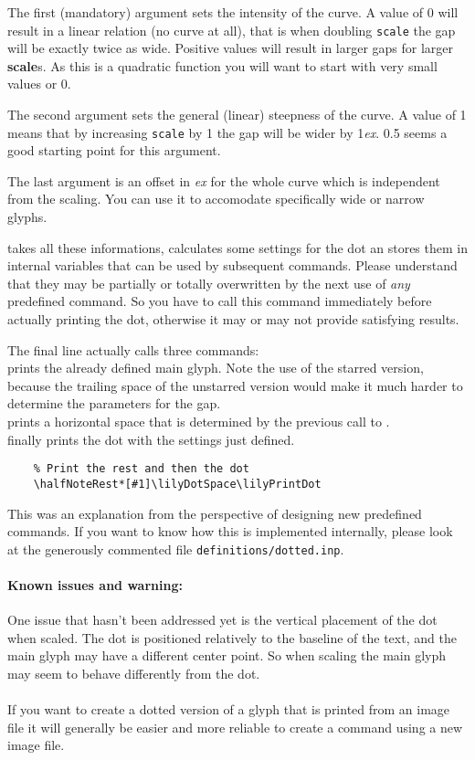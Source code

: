 \documentclass{article}
\begin{document}
The first (mandatory) argument sets the intensity of the curve.
A value of 0 will result in a linear relation (no curve at all), that is when doubling \texttt{scale} the gap will be exactly twice as wide.
Positive values will result in larger gaps for larger \textbf{scale}s.
As this is a quadratic function you will want to start with very small values or 0.

The second argument sets the general (linear) steepness of the curve.
A value of 1 means that by increasing \texttt{scale} by 1 the gap will be wider by 1\emph{ex}.
0.5 seems a good starting point for this argument.

The last argument is an offset in \emph{ex} for the whole curve which is independent from the scaling.
You can use it to accomodate specifically wide or narrow glyphs.

 takes all these informations, calculates some settings for the dot an stores them in internal variables that can be used by subsequent commands.
Please understand that they may be partially or totally overwritten by the next use of \emph{any} predefined command.
So you have to call this command immediately before actually printing the dot, otherwise it may or may not provide satisfying results.

The final line actually calls three commands:\\
 prints the already defined main glyph.
Note the use of the starred version, because the trailing space of the unstarred version would make it much harder to determine the parameters for the gap.\\
 prints a horizontal space that is determined by the previous call to .\\
 finally prints the dot with the settings just defined.

\begin{verbatim}
    % Print the rest and then the dot
    \halfNoteRest*[#1]\lilyDotSpace\lilyPrintDot
\end{verbatim}

This was an explanation from the perspective of designing new predefined commands.
If you want to know how this is implemented internally, please look at the generously commented file \texttt{definitions/dotted.inp}.

\paragraph*{Known issues and warning:} 
One issue that hasn't been addressed yet is the vertical placement of the dot when scaled.
The dot is positioned relatively to the baseline of the text, and the main glyph may have a different center point. 
So when scaling the main glyph may seem to behave differently from the dot.\\~\\
If you want to create a dotted version of a glyph that is printed from an image file it will generally be easier and more reliable to create a command using a new image file.
\end{document}
